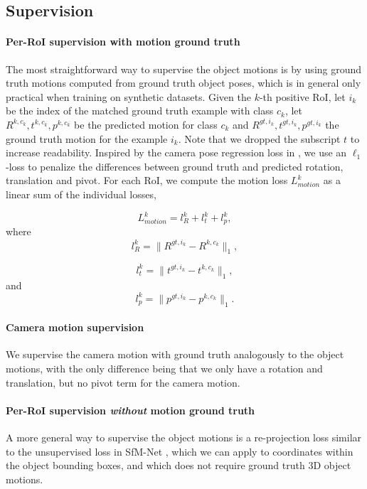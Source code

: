 \subsection{Supervision}

\paragraph{Per-RoI supervision with motion ground truth}
The most straightforward way to supervise the object motions is by using ground truth
motions computed from ground truth object poses, which is in general
only practical when training on synthetic datasets.
Given the $k$-th positive RoI, let $i_k$ be the index of the matched ground truth example with class $c_k$,
let $R^{k,c_k}, t^{k,c_k}, p^{k,c_k}$ be the predicted motion for class $c_k$
and $R^{gt,i_k}, t^{gt,i_k}, p^{gt,i_k}$ the ground truth motion for the example $i_k$.
Note that we dropped the subscript $t$ to increase readability.
Inspired by the camera pose regression loss in \cite{PoseNet2},
we use an $\ell_1$-loss to penalize the differences between ground truth and predicted %
rotation, translation and pivot.
For each RoI, we compute the motion loss $L_{motion}^k$ as a linear sum of
the individual losses,

\begin{equation}
L_{motion}^k =l_{R}^k + l_{t}^k + l_{p}^k,
\end{equation}
where
\begin{equation}
l_{R}^k = \lVert R^{gt,i_k} - R^{k,c_k} \rVert _1,
\end{equation}

\begin{equation}
l_{t}^k = \lVert t^{gt,i_k} - t^{k,c_k} \rVert_1,
\end{equation}
and
\begin{equation}
l_{p}^k = \lVert p^{gt,i_k} - p^{k,c_k} \rVert_1.
\end{equation}

\paragraph{Camera motion supervision}
We supervise the camera motion with ground truth analogously to the
object motions, with the only difference being that we only have
a rotation and translation, but no pivot term for the camera motion.

\paragraph{Per-RoI supervision \emph{without} motion ground truth}
A more general way to supervise the object motions is a re-projection
loss similar to the unsupervised loss in SfM-Net \cite{SfmNet},
which we can apply to coordinates within the object bounding boxes,
and which does not require ground truth 3D object motions.


